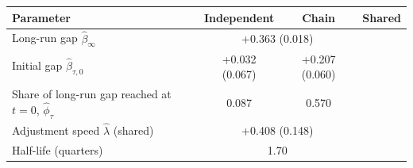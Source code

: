 \begin{tabular}{@{}lccc@{}}
\toprule
Parameter & Independent & Chain & Shared \\
\midrule
Long-run gap $\hat\beta_\infty$ & \multicolumn{2}{c}{+0.363 (0.018)} & \\
Initial gap $\hat\beta_{\tau,0}$ & +0.032 (0.067) & +0.207 (0.060) & \\
Share of long-run gap reached at $t=0$, $\hat\phi_\tau$ & 0.087 & 0.570 & \\
Adjustment speed $\hat\lambda$ (shared) & \multicolumn{2}{c}{+0.408 (0.148)} & \\
Half-life (quarters) & \multicolumn{2}{c}{1.70} & \\
\bottomrule
\end{tabular}
